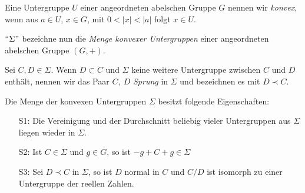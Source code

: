 \begin{defn}\label{konvexUGR} %
Eine Untergruppe $U$ einer angeordneten abelschen Gruppe $G$ nennen wir \textit{konvex}, wenn aus $a \in U$, $x \in G$, mit $0 < |x| < |a|$ folgt $x \in U$.\\
\end{defn}
$``\Sigma "$ bezeichne nun die \textit{Menge konvexer Untergruppen} einer angeordneten abelschen Gruppe $\left(G, +\right)$. 
\begin{defn}\label{Sprung} %
Sei $C, D \in \Sigma$. Wenn $D \subset C$ und $\Sigma$ keine weitere Untergruppe zwischen $C$ und $D$ enthält, nennen wir das Paar $C,~D$ \textit{Sprung} in $\Sigma$ und bezeichnen es mit $D \prec C$.
\end{defn}
%
% 
%
%
\begin{satz}\label{EigenschaftenKonvexeUgr}
Die Menge der konvexen Untergruppen $\Sigma$ besitzt folgende Eigenschaften:
\begin{enumerate}
\item[S1:] Die Vereinigung und der Durchschnitt beliebig vieler Untergruppen aus $\Sigma$ liegen wieder in $\Sigma$.
\item[S2:] Ist $C \in\Sigma$ und $g \in G$, so ist $-g+C+g\in \Sigma$
\item[S3:] Sei $D \prec C$ in $\Sigma$, so ist $D$ normal in $C$ und $C/D$ ist isomorph zu einer Untergruppe der reellen Zahlen.
\end{enumerate}
\end{satz}
